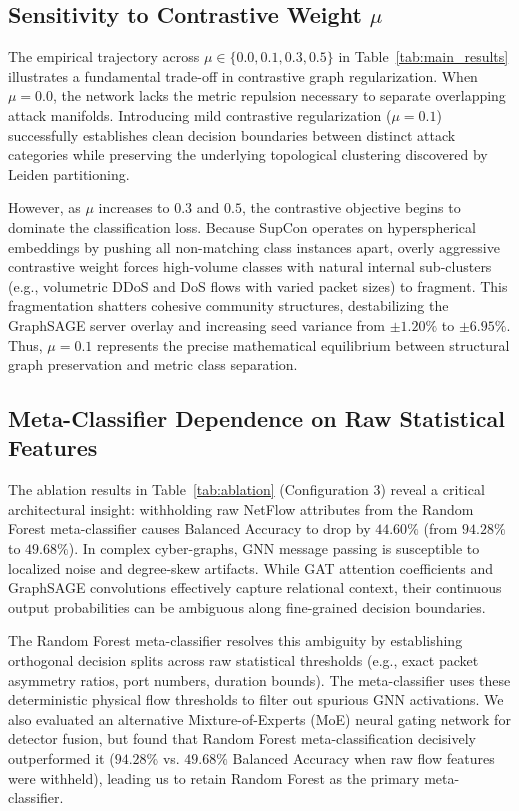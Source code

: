 \documentclass[journal,onecolumn]{IEEEtran}
\begin{document}
\subsection{Sensitivity to Contrastive Weight $\mu$}
The empirical trajectory across $\mu \in \{0.0, 0.1, 0.3, 0.5\}$ in Table~\ref{tab:main_results} illustrates a fundamental trade-off in contrastive graph regularization. When $\mu = 0.0$, the network lacks the metric repulsion necessary to separate overlapping attack manifolds. Introducing mild contrastive regularization ($\mu = 0.1$) successfully establishes clean decision boundaries between distinct attack categories while preserving the underlying topological clustering discovered by Leiden partitioning.

However, as $\mu$ increases to $0.3$ and $0.5$, the contrastive objective begins to dominate the classification loss. Because SupCon operates on hyperspherical embeddings by pushing all non-matching class instances apart, overly aggressive contrastive weight forces high-volume classes with natural internal sub-clusters (e.g., volumetric DDoS and DoS flows with varied packet sizes) to fragment. This fragmentation shatters cohesive community structures, destabilizing the GraphSAGE server overlay and increasing seed variance from $\pm 1.20\%$ to $\pm 6.95\%$. Thus, $\mu = 0.1$ represents the precise mathematical equilibrium between structural graph preservation and metric class separation.

\subsection{Meta-Classifier Dependence on Raw Statistical Features}
The ablation results in Table~\ref{tab:ablation} (Configuration 3) reveal a critical architectural insight: withholding raw NetFlow attributes from the Random Forest meta-classifier causes Balanced Accuracy to drop by $44.60\%$ (from $94.28\%$ to $49.68\%$). In complex cyber-graphs, GNN message passing is susceptible to localized noise and degree-skew artifacts. While GAT attention coefficients and GraphSAGE convolutions effectively capture relational context, their continuous output probabilities can be ambiguous along fine-grained decision boundaries.

The Random Forest meta-classifier resolves this ambiguity by establishing orthogonal decision splits across raw statistical thresholds (e.g., exact packet asymmetry ratios, port numbers, duration bounds). The meta-classifier uses these deterministic physical flow thresholds to filter out spurious GNN activations. We also evaluated an alternative Mixture-of-Experts (MoE) neural gating network for detector fusion, but found that Random Forest meta-classification decisively outperformed it ($94.28\%$ vs. $49.68\%$ Balanced Accuracy when raw flow features were withheld), leading us to retain Random Forest as the primary meta-classifier.
\end{document}
